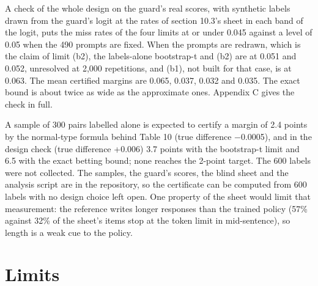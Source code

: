 \documentclass[11pt]{article}
\begin{document}
A check of the whole design on the guard's real scores, with synthetic labels drawn from the guard's logit at the rates of section 10.3's sheet in each band of the logit, puts the miss rates of the four limits at or under 0.045 against a level of 0.05 when the 490 prompts are fixed. When the prompts are redrawn, which is the claim of limit (b2), the labels-alone bootstrap-t and (b2) are at 0.051 and 0.052, unresolved at 2,000 repetitions, and (b1), not built for that case, is at 0.063. The mean certified margins are 0.065, 0.037, 0.032 and 0.035. The exact bound is about twice as wide as the approximate ones. Appendix C gives the check in full.


A sample of 300 pairs labelled alone is expected to certify a margin of 2.4 points by the normal-type formula behind Table 10 (true difference $-$0.0005), and in the design check (true difference +0.006) 3.7 points with the bootstrap-t limit and 6.5 with the exact betting bound; none reaches the 2-point target. The 600 labels were not collected. The samples, the guard's scores, the blind sheet and the analysis script are in the repository, so the certificate can be computed from 600 labels with no design choice left open. One property of the sheet would limit that measurement: the reference writes longer responses than the trained policy (57\% against 32\% of the sheet's items stop at the token limit in mid-sentence), so length is a weak cue to the policy.


\section{Limits}
\end{document}
